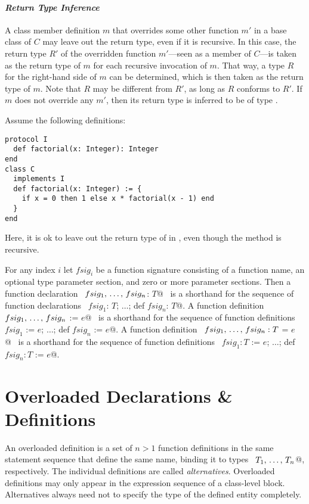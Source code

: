 \paragraph{\em Return Type Inference}
A class member definition $m$ that overrides some other function $m'$ in a base class of $C$ may leave out the return type, even if it is recursive. In this case, the return type $R'$ of the overridden function $m'$---seen as a member of $C$---is taken as the return type of $m$ for each recursive invocation of $m$. That way, a type $R$ for the right-hand side of $m$ can be determined, which is then taken as the return type of $m$. Note that $R$ may be different from $R'$, as long as $R$ conforms to $R'$. If $m$ does not override any $m'$, then its return type is inferred to be of type . 

\example Assume the following definitions:
\begin{lstlisting}
protocol I
  def factorial(x: Integer): Integer
end
class C 
  implements I
  def factorial(x: Integer) := {
    if x = 0 then 1 else x * factorial(x - 1) end
  }
end
\end{lstlisting}
Here, it is ok to leave out the return type of \lstinline@factorial@
in \lstinline@C@, even though the method is recursive. 

For any index $i$ let $fsig_i$ be a function signature consisting of a function
name, an optional type parameter section, and zero or more parameter
sections. Then a function declaration 
~\lstinline@def $fsig_1 ,\, \ldots ,\, fsig_n$: $T$@~ 
is a shorthand for the sequence of function
declarations ~\lstinline@def $fsig_1$: $T$; $\ldots$; def $fsig_n$: $T$@.  
A function definition ~\lstinline@def $fsig_1 ,\, \ldots ,\, fsig_n$ := $e$@~ is a
shorthand for the sequence of function definitions 
~\lstinline@def $fsig_1$ := $e$; $\ldots$; def $fsig_n$ := $e$@.  
A function definition
~\lstinline@def $fsig_1 ,\, \ldots ,\, fsig_n: T$ = $e$@~ is a shorthand for the
sequence of function definitions 
~\lstinline@def $fsig_1: T$ := $e$; $\ldots$; def $fsig_n: T$ := $e$@.

\section{Overloaded Declarations \& Definitions}
\label{sec:overloaded-definitions}

An overloaded definition is a set of $n > 1$ function
definitions in the same statement sequence that define the same name,
binding it to types ~\lstinline@$T_1 ,\, \ldots ,\, T_n$@, respectively.
The individual definitions are called {\em alternatives}. Overloaded
definitions may only appear in the expression sequence of a class-level block.
Alternatives always need not to specify the type of the defined entity
completely.

